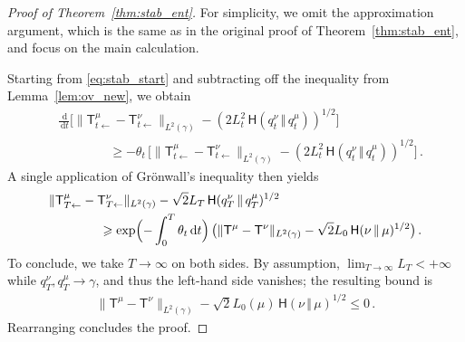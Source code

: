 \documentclass[12pt]{article}
\newcommand{\1}{\mathds{1}}
\newcommand*{\rd}{\mathrm{d}}
\newcommand*{\dd}{\, \rd}
\newcommand{\mmid}{\,\Vert\,}
\renewcommand{\geq}{\geqslant}
\renewcommand{\leq}{\leqslant}
\newcommand{\KM}{\mathsf T}
\theoremstyle{plain}
\theoremstyle{definition}
\theoremstyle{remark}
\begin{document}
\begin{proof}[Proof of Theorem~\ref{thm:stab_ent}]
For simplicity, we omit the approximation argument, which is the same as in the original proof of Theorem~\ref{thm:stab_ent}, and focus on the main calculation.

Starting from \eqref{eq:stab_start} and subtracting off the inequality from Lemma~\ref{lem:ov_new}, we obtain
\begin{align*}
&\frac{\dd}{\dd t} \bigl[ \|\KM^\mu_{t\gets} - \KM^\nu_{t\gets}\|_{L^2(\gamma)} - (2L^2_{t}\,{\mathsf H}(q^\nu_{t}\mmid q^\mu_{t}))^{1/2} \bigr] \\
&\qquad \qquad \geq -\theta_{t}\,\bigl[\|\KM^\mu_{t\gets} - \KM^\nu_{t\gets}\|_{L^2(\gamma)} - (2L^2_{t}\,{\mathsf H}(q^\nu_{t}\mmid q^\mu_{t}))^{1/2}\bigr]\,.
\end{align*}
A single application of Gr\"onwall's inequality then yields
\begin{align*}
    &\|\KM^\mu_{T\gets}-\KM^\nu_{T\gets}\|_{L^2(\gamma)} - \sqrt{2}L_{T}\,{\mathsf H}(q^\nu_{T} \mmid q^\mu_{T})^{1/2} \\
    &\qquad \qquad \geq \exp\Bigl(-\int_0^T \theta_t\dd t\Bigr)\,\bigl( \|\KM^\mu -\KM^\nu\|_{L^2(\gamma)} - \sqrt{2}L_{0}\,{\mathsf H}(\nu\mmid \mu)^{1/2} \bigr)\,.
\end{align*}
To conclude, we take $T \rightarrow \infty$ on both sides. By assumption, $\lim_{T\to\infty }L_T < +\infty$ while $q_T^\nu,q_T^\mu \to \gamma$, and thus the left-hand side vanishes; the resulting bound is
\begin{align*}
\|\mathsf T^\mu - \mathsf T^\nu\|_{L^2(\gamma)} - \sqrt{2}L_0(\mu)\, {\mathsf H}(\nu\mmid\mu)^{1/2} \leq 0\,.
\end{align*}
Rearranging concludes the proof.
\end{proof}
\end{document}
